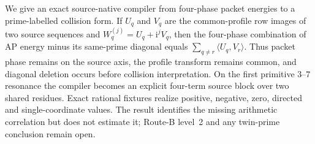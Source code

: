 We give an exact source-native compiler from four-phase packet energies to a
prime-labelled collision form.  If $U_q$ and $V_q$ are the common-profile row images
of two source sequences and $W_q^{(j)}=U_q+\mathrm i^jV_q$, then the four-phase
combination of AP energy minus its same-prime diagonal equals
$\sum_{q\ne r}\langle U_q,V_r\rangle$.  Thus packet phase remains on the source axis,
the profile transform remains common, and diagonal deletion occurs before collision
interpretation.  On the first primitive $3$--$7$ resonance the compiler becomes an
explicit four-term source block over two shared residues.  Exact rational fixtures
realize positive, negative, zero, directed and single-coordinate values.  The result
identifies the missing arithmetic correlation but does not estimate it; Route-B level~2
and any twin-prime conclusion remain open.

